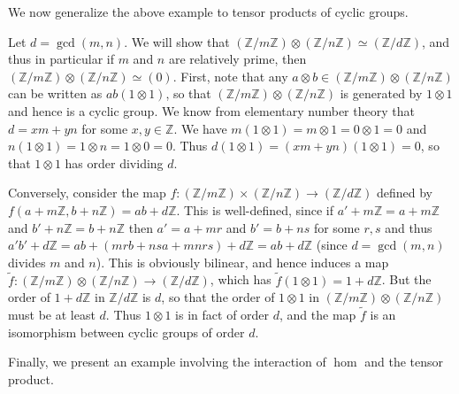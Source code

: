 We now generalize the above example to tensor products of cyclic groups. 
\begin{example} 
Let $d=\gcd(m,n)$. We will show that
$(\mathbb{Z}/m\mathbb{Z})\otimes(\mathbb{Z}/n\mathbb{Z})\simeq(\mathbb{Z}/d\mathbb{Z})$, and thus in particular if $m$ and $n$
are relatively prime, then $(\mathbb{Z}/m\mathbb{Z})\otimes(\mathbb{Z}/n\mathbb{Z})\simeq(0)$. First, note that
any $a\otimes b\in(\mathbb{Z}/m\mathbb{Z})\otimes(\mathbb{Z}/n\mathbb{Z})$ can be written as $ab(1\otimes 1)$,
so that $(\mathbb{Z}/m\mathbb{Z})\otimes(\mathbb{Z}/n\mathbb{Z})$ is generated by $1\otimes 1$ and hence
is a cyclic group. We know from elementary number theory that $d=xm+yn$
for some $x,y\in\mathbb{Z}$. We have $m(1\otimes 1)=m\otimes 1=0\otimes 1=0$ and
$n(1\otimes 1)=1\otimes n=1\otimes0=0$. Thus $d(1\otimes 1)=(xm+yn)(1\otimes
1)=0$, so that $1\otimes1$ has order dividing $d$.

Conversely, consider the map
$f:(\mathbb{Z}/m\mathbb{Z})\times(\mathbb{Z}/n\mathbb{Z})\rightarrow(\mathbb{Z}/d\mathbb{Z})$ defined by
$f(a+m\mathbb{Z},b+n\mathbb{Z})=ab+d\mathbb{Z}$. This is well-defined, since if $a'+m\mathbb{Z}=a+m\mathbb{Z}$
and $b'+n\mathbb{Z}=b+n\mathbb{Z}$ then $a'=a+mr$ and $b'=b+ns$ for some $r,s$ and
thus $a'b'+d\mathbb{Z}=ab+(mrb+nsa+mnrs)+d\mathbb{Z}=ab+d\mathbb{Z}$ (since $d=\gcd(m,n)$
divides $m$ and $n$). This is obviously bilinear, and hence induces a map
$\tilde{f}:(\mathbb{Z}/m\mathbb{Z})\otimes(\mathbb{Z}/n\mathbb{Z})\rightarrow(\mathbb{Z}/d\mathbb{Z})$, which
has $\tilde{f}(1\otimes1)=1+d\mathbb{Z}$. But the order of $1+d\mathbb{Z}$
in $\mathbb{Z}/d\mathbb{Z}$ is $d$, so that the order of $1\otimes1$ in
$(\mathbb{Z}/m\mathbb{Z})\otimes(\mathbb{Z}/n\mathbb{Z})$ must be at least $d$. Thus $1\otimes1$ is in fact
of order $d$, and the map $\tilde{f}$ is an isomorphism between cyclic groups
of order $d$. 
\end{example} 

Finally, we present an example involving the interaction of $\hom$ and the
tensor product.

